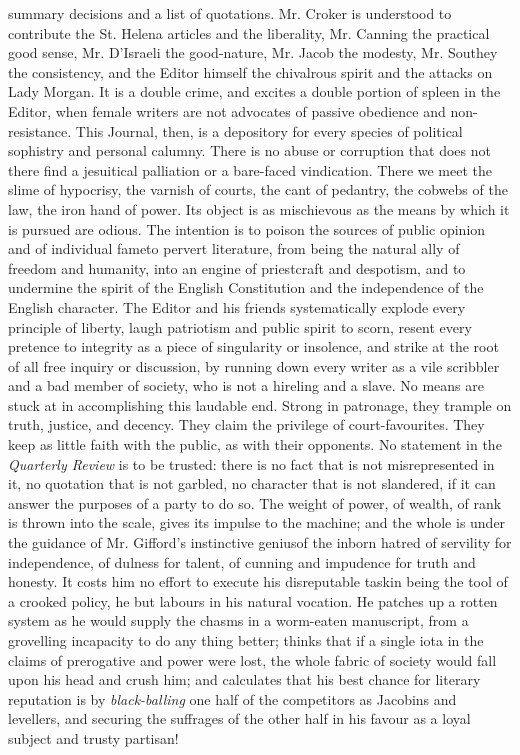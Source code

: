 summary decisions and a list of quotations. Mr. Croker is
understood to contribute the St. Helena articles and the
liberality, Mr. Canning the practical good sense, Mr. D'Israeli
the good-nature, Mr. Jacob the modesty, Mr. Southey the
consistency, and the Editor himself the chivalrous spirit and the
attacks on Lady Morgan. It is a double crime, and excites a double
portion of spleen in the Editor, when female writers are not
advocates of passive obedience and non-resistance. This Journal,
then, is a depository for every species of political sophistry and
personal calumny. There is no abuse or corruption that does not
there find a jesuitical palliation or a bare-faced
vindication. There we meet the slime of hypocrisy, the varnish of
courts, the cant of pedantry, the cobwebs of the law, the iron
hand of power. Its object is as mischievous as the means by which
it is pursued are odious. The intention is to poison the sources
of public opinion and of individual fame\textemdash to pervert
literature, from being the natural ally of freedom and humanity,
into an engine of priestcraft and despotism, and to undermine the
spirit of the English Constitution and the independence of the
English character.  The Editor and his friends systematically
explode every principle of liberty, laugh patriotism and public
spirit to scorn, resent every pretence to integrity as a piece of
singularity or insolence, and strike at the root of all free
inquiry or discussion, by running down every writer as a vile
scribbler and a bad member of society, who is not a hireling and a
slave. No means are stuck at in accomplishing this laudable
end. Strong in patronage, they trample on truth, justice, and
decency. They claim the privilege of court-favourites. They keep
as little faith with the public, as with their opponents. No
statement in the \emph{Quarterly Review} is to be trusted: there
is no fact that is not misrepresented in it, no quotation that is
not garbled, no character that is not slandered, if it can answer
the purposes of a party to do so. The weight of power, of wealth,
of rank is thrown into the scale, gives its impulse to the
machine; and the whole is under the guidance of Mr. Gifford's
instinctive genius\textemdash of the inborn hatred of servility
for independence, of dulness for talent, of cunning and impudence
for truth and honesty. It costs him no effort to execute his
disreputable task\textemdash in being the tool of a crooked
policy, he but labours in his natural vocation. He patches up a
rotten system as he would supply the chasms in a worm-eaten
manuscript, from a grovelling incapacity to do any thing better;
thinks that if a single iota in the claims of prerogative and
power were lost, the whole fabric of society would fall upon his
head and crush him; and calculates that his best chance for
literary reputation is by \emph{black-balling} one half of the
competitors as Jacobins and levellers, and securing the suffrages
of the other half in his favour as a loyal subject and trusty
partisan!


